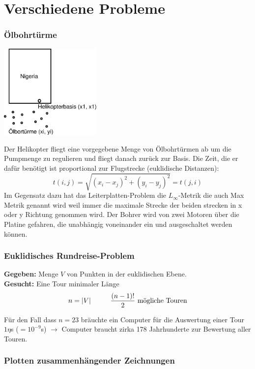 
\section{Verschiedene Probleme}

\subsubsection{Ölbohrtürme}

\includegraphics[width=5cm]{bilder/1-1Nigeria}

Der Helikopter fliegt eine vorgegebene Menge von Ölbohrtürmen ab um die
Pumpmenge zu regulieren und fliegt danach zurück zur Basis. Die Zeit, die
er dafür benötigt ist proportional zur Flugstrecke (euklidische Distanzen):
\[t(i,j) = \sqrt{(x_{i} - x_{j})^{2} + (y_{i} - y_{j})^{2}} = t(j,i)\]
Im Gegensatz dazu hat das Leiterplatten-Problem die $L_{\infty}$-Metrik die
auch Max Metrik genannt wird weil immer die maximale Strecke der beiden
strecken in x oder y Richtung genommen wird. Der Bohrer wird von zwei
Motoren über die Platine gefahren, die unabhängig voneinander ein und
ausgeschaltet werden können.

\subsubsection{Euklidisches Rundreise-Problem}

{\bf Gegeben:} Menge $V$ von Punkten in der euklidischen Ebene.\\
{\bf Gesucht:} Eine Tour minimaler Länge
\[n = |V| \hspace{10mm} \frac{(n-1)!}{2} \mbox{ mögliche Touren}\]

Für den Fall dass $n=23$ bräuchte ein Computer für die Auswertung einer
Tour $1\eta$s ($=10^{-9}$s) $\rightarrow$ Computer braucht zirka 178
Jahrhunderte zur Bewertung aller Touren.

\subsubsection{Plotten zusammenhängender Zeichnungen}

